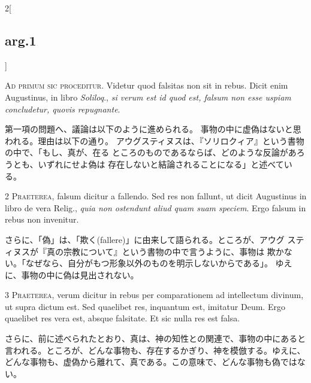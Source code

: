 \documentclass[paper=a4paper,fontsize=10pt,jafontsize=9pt,titlepage]{jlreq}
\begin{document}
\begin{paracol}{2}[\subsection{arg.1}]


{\huge A}{\scshape d primum sic proceditur}. Videtur quod falsitas non
sit in rebus. Dicit enim Augustinus, in libro {\itshape Soliloq}.,
{\itshape si verum est id quod est, falsum non esse uspiam concludetur,
quovis repugnante}.

\switchcolumn

第一項の問題へ、議論は以下のように進められる。
事物の中に虚偽はないと思われる。理由は以下の通り。
アウグスティヌスは、『ソリロクィア』という書物の中で、「もし、真が、在る
 ところのものであるならば、どのような反論があろうとも、いずれにせよ偽は
 存在しないと結論されることになる」と述べている。



{\scshape 2 Praeterea}, falsum dicitur a fallendo. Sed
res non fallunt, ut dicit Augustinus in libro de vera Relig., {\itshape quia non
ostendunt aliud quam suam speciem}. Ergo falsum in rebus non invenitur.

\switchcolumn

さらに、「偽」は、「欺く(fallere)」に由来して語られる。ところが、アウグ
 スティヌスが『真の宗教について』という書物の中で言うように、事物は
 欺かない。「なぜなら、自分がもつ形象以外のものを明示しないからである」。
 ゆえに、事物の中に偽は見出されない。



{\scshape 3 Praeterea}, verum dicitur in rebus per
comparationem ad intellectum divinum, ut supra dictum est. Sed quaelibet
res, inquantum est, imitatur Deum. Ergo quaelibet res vera est, absque
falsitate. Et sic nulla res est falsa.

\switchcolumn

さらに、前に述べられたとおり、真は、神の知性との関連で、事物の中にあると
 言われる。ところが、どんな事物も、存在するかぎり、神を模倣する。ゆえに、
 どんな事物も、虚偽から離れて、真である。この意味で、どんな事物も偽ではな
 い。


\end{paracol}
\end{document}

